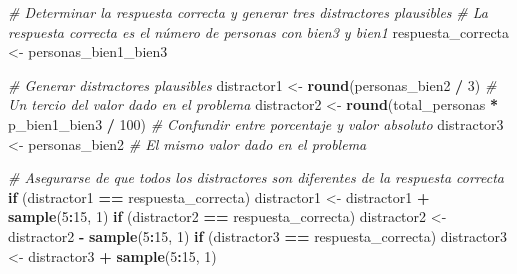 \documentclass[
]{article}
\newenvironment{Shaded}{\begin{snugshade}}{\end{snugshade}}
\newcommand{\CommentTok}[1]{\textcolor[rgb]{0.56,0.35,0.01}{\textit{#1}}}
\newcommand{\ControlFlowTok}[1]{\textcolor[rgb]{0.13,0.29,0.53}{\textbf{#1}}}
\newcommand{\DecValTok}[1]{\textcolor[rgb]{0.00,0.00,0.81}{#1}}
\newcommand{\FunctionTok}[1]{\textcolor[rgb]{0.13,0.29,0.53}{\textbf{#1}}}
\newcommand{\NormalTok}[1]{#1}
\newcommand{\OtherTok}[1]{\textcolor[rgb]{0.56,0.35,0.01}{#1}}
\newcommand{\SpecialCharTok}[1]{\textcolor[rgb]{0.81,0.36,0.00}{\textbf{#1}}}
\begin{document}
\begin{Shaded}
\begin{Highlighting}[]
\CommentTok{\# Determinar la respuesta correcta y generar tres distractores plausibles}
\CommentTok{\# La respuesta correcta es el número de personas con bien3 y bien1}
\NormalTok{respuesta\_correcta }\OtherTok{\textless{}{-}}\NormalTok{ personas\_bien1\_bien3}

\CommentTok{\# Generar distractores plausibles}
\NormalTok{distractor1 }\OtherTok{\textless{}{-}} \FunctionTok{round}\NormalTok{(personas\_bien2 }\SpecialCharTok{/} \DecValTok{3}\NormalTok{)  }\CommentTok{\# Un tercio del valor dado en el problema}
\NormalTok{distractor2 }\OtherTok{\textless{}{-}} \FunctionTok{round}\NormalTok{(total\_personas }\SpecialCharTok{*}\NormalTok{ p\_bien1\_bien3 }\SpecialCharTok{/} \DecValTok{100}\NormalTok{)  }\CommentTok{\# Confundir entre porcentaje y valor absoluto}
\NormalTok{distractor3 }\OtherTok{\textless{}{-}}\NormalTok{ personas\_bien2  }\CommentTok{\# El mismo valor dado en el problema}

\CommentTok{\# Asegurarse de que todos los distractores son diferentes de la respuesta correcta}
\ControlFlowTok{if}\NormalTok{ (distractor1 }\SpecialCharTok{==}\NormalTok{ respuesta\_correcta) distractor1 }\OtherTok{\textless{}{-}}\NormalTok{ distractor1 }\SpecialCharTok{+} \FunctionTok{sample}\NormalTok{(}\DecValTok{5}\SpecialCharTok{:}\DecValTok{15}\NormalTok{, }\DecValTok{1}\NormalTok{)}
\ControlFlowTok{if}\NormalTok{ (distractor2 }\SpecialCharTok{==}\NormalTok{ respuesta\_correcta) distractor2 }\OtherTok{\textless{}{-}}\NormalTok{ distractor2 }\SpecialCharTok{{-}} \FunctionTok{sample}\NormalTok{(}\DecValTok{5}\SpecialCharTok{:}\DecValTok{15}\NormalTok{, }\DecValTok{1}\NormalTok{)}
\ControlFlowTok{if}\NormalTok{ (distractor3 }\SpecialCharTok{==}\NormalTok{ respuesta\_correcta) distractor3 }\OtherTok{\textless{}{-}}\NormalTok{ distractor3 }\SpecialCharTok{+} \FunctionTok{sample}\NormalTok{(}\DecValTok{5}\SpecialCharTok{:}\DecValTok{15}\NormalTok{, }\DecValTok{1}\NormalTok{)}


\end{Highlighting}
\end{Shaded}
\end{document}
